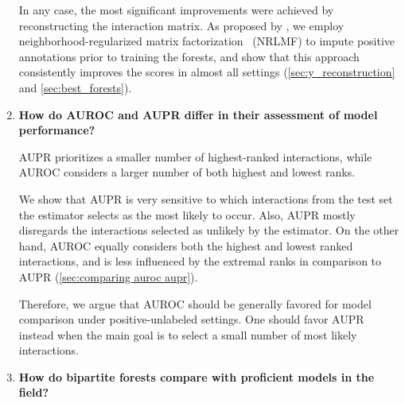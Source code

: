 \begin{enumerate}
    In any case, the most significant improvements were achieved by reconstructing the interaction matrix.
    As proposed by \cite{pliakos2020drugtarget}, we employ neighborhood-regularized matrix factorization~\cite{liu2016neighborhood} (NRLMF) to impute positive annotations prior to training the forests, and show that this approach consistently improves the scores in almost all settings (\autoref{sec:y_reconstruction} and \autoref{sec:best_forests}).

    \item \textbf{How do AUROC and AUPR differ in their assessment of model performance?}

    AUPR prioritizes a smaller number of highest-ranked interactions, while AUROC considers a larger number of both highest and lowest ranks.

    We show that AUPR is very sensitive to which interactions from the test set the estimator selects as the most likely to occur. Also, AUPR mostly disregards the interactions selected as unlikely by the estimator. On the other hand, AUROC equally considers both the highest and lowest ranked interactions, and is less influenced by the extremal ranks in comparison to AUPR (\autoref{sec:comparing auroc aupr}).

    Therefore, we argue that AUROC should be generally favored for model comparison under positive-unlabeled settings. One should favor AUPR instead when the main goal is to select a small number of most likely interactions.

    \item \textbf{How do bipartite forests compare with proficient models in the field?}


\end{enumerate}
